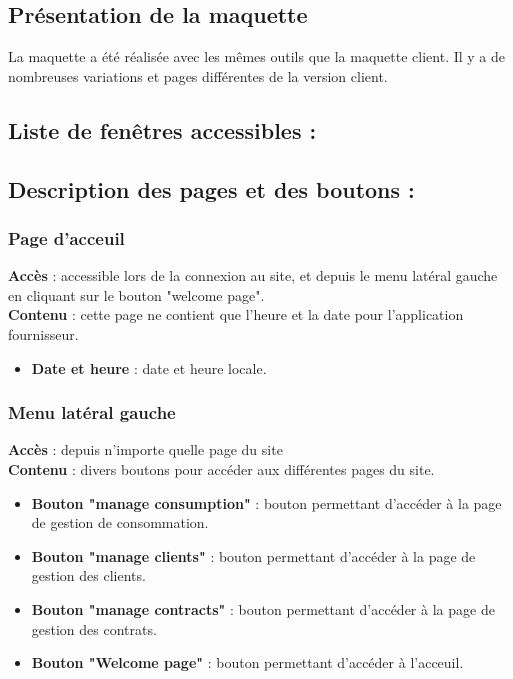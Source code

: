 \documentclass[../rapport.tex]{subfiles}
\begin{document}
\subsection{Présentation de la maquette}
La maquette a été réalisée avec les mêmes outils que la maquette client. Il y a de nombreuses variations et pages différentes de la version client. 

\subsection{Liste de fenêtres accessibles : }

\subsection{Description des pages et des boutons :}

\subsubsection{Page d'acceuil}
\noindent \textbf{Accès} :  accessible lors de la connexion au site, et depuis le menu latéral gauche en cliquant sur le bouton "welcome page".\\
\textbf{Contenu }: cette page ne contient que l'heure et la date pour l'application fournisseur.
\begin{itemize}
    \item \textbf{Date et heure} : date et heure locale. 
\end{itemize}

\subsubsection{Menu latéral gauche}
\noindent \textbf{Accès} :  depuis n'importe quelle page du site\\
\textbf{Contenu }: divers boutons pour accéder aux différentes pages du site.
\begin{itemize}
    \item \textbf{Bouton "manage consumption"} : bouton permettant d'accéder à la page de gestion de consommation.
    \item \textbf{Bouton "manage clients"} : bouton permettant d'accéder à la page de gestion des clients.
    \item \textbf{Bouton "manage contracts"} : bouton permettant d'accéder à la page de gestion des contrats.
    \item \textbf{Bouton "Welcome page"} : bouton permettant d'accéder à l'acceuil.
\end{itemize}
\end{document}
